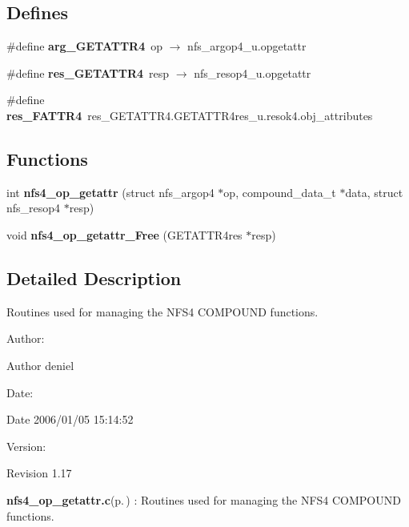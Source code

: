 \subsection*{Defines}
\begin{CompactItemize}
\item 
\#define {\bf arg\_\-GETATTR4}\ op $\rightarrow$ nfs\_\-argop4\_\-u.opgetattr
\item 
\#define {\bf res\_\-GETATTR4}\ resp $\rightarrow$ nfs\_\-resop4\_\-u.opgetattr
\item 
\#define {\bf res\_\-FATTR4}\ res\_\-GETATTR4.GETATTR4res\_\-u.resok4.obj\_\-attributes
\end{CompactItemize}
\subsection*{Functions}
\begin{CompactItemize}
\item 
int {\bf nfs4\_\-op\_\-getattr} (struct nfs\_\-argop4 $\ast$op, compound\_\-data\_\-t $\ast$data, struct nfs\_\-resop4 $\ast$resp)
\item 
void {\bf nfs4\_\-op\_\-getattr\_\-Free} (GETATTR4res $\ast$resp)
\end{CompactItemize}


\subsection{Detailed Description}
Routines used for managing the NFS4 COMPOUND functions. 

\begin{Desc}
\item[Author:]\begin{Desc}
\item[Author]deniel \end{Desc}
\end{Desc}
\begin{Desc}
\item[Date:]\begin{Desc}
\item[Date]2006/01/05 15:14:52 \end{Desc}
\end{Desc}
\begin{Desc}
\item[Version:]\begin{Desc}
\item[Revision]1.17 \end{Desc}
\end{Desc}
{\bf nfs4\_\-op\_\-getattr.c}{\rm (p.\,\pageref{nfs4__op__getattr_8c})} : Routines used for managing the NFS4 COMPOUND functions.

